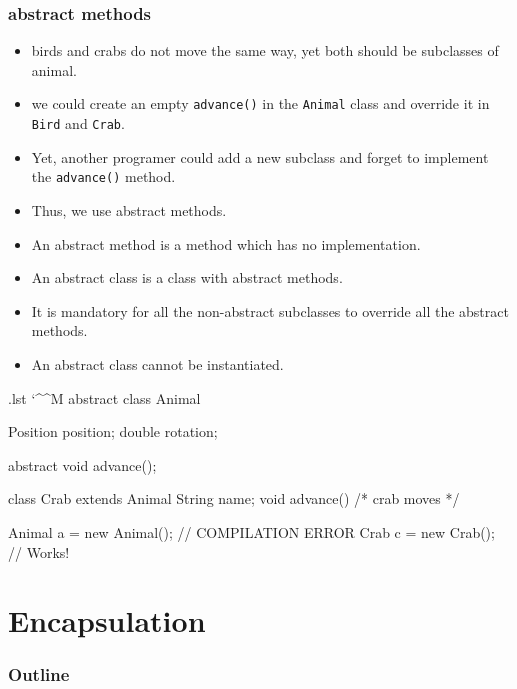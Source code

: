 \documentclass[10pt,handout]{beamer}
\makeatletter
\newenvironment{code}{%
  \begingroup
  \@bsphack
  \immediate\openout\lstvrb@out\jobname.lst
  \let\do\@makeother\dospecials\catcode`\^^M\active
  \def\verbatim@processline{%
    \immediate\write\lstvrb@out{\the\verbatim@line}}%
  \verbatim@start}{%
  \immediate\closeout\lstvrb@out
  \@esphack
  \endgroup
  
  \begin{alertblock}{}
    
  \end{alertblock}}
\makeatother
\begin{document}
\begin{frame}[fragile]
  \frametitle{abstract methods}


  \begin{itemize}
    \item birds and crabs do not move the same way, yet both should be subclasses of animal.
    \item we could create an empty \verb!advance()! in the \verb!Animal! class and override it in \verb!Bird! and \verb!Crab!.
    \item Yet, another programer could add a new subclass and forget to implement the \verb!advance()! method.
    \item Thus, we use \alert{abstract methods}.
  \end{itemize}

  \begin{definition}
    \begin{itemize}
      \item An abstract method is a method which has no implementation. 
      \item An abstract class is a class with abstract methods.
      \item It is mandatory for all the non-abstract subclasses to override all the abstract methods.
      \item An abstract class cannot be instantiated.
    \end{itemize}
 \end{definition}
\end{frame}

\begin{frame}
  \begin{code}
abstract class Animal {
  Position position;
  double rotation;

  abstract void advance();    
 
}

class Crab extends Animal{
  String name;
  void advance() {
    /* crab moves */
  }
}

Animal a = new Animal(); // COMPILATION ERROR
Crab   c = new Crab();   // Works!
\end{code}
\end{frame}

\section{Encapsulation}
\begin{frame}
  \frametitle{Outline}
  \tableofcontents[currentsection]
\end{frame}
\end{document}
